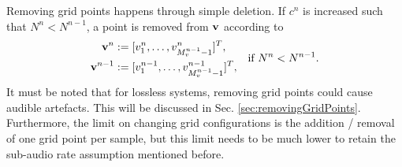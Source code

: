 \documentclass[fleqn]{jaes}
\begin{document}
Removing grid points happens through simple deletion. If $c^n$ is increased such that $N^n < N^{n-1}$, a point is removed from $\mathbf{v}$ according to
\begin{equation}\label{eq:removePoint}
\begin{aligned}
    \v^n &:= [v_1^n, \hdots, v_{M_v^{n-1}-1}^n]^T,\\
    \v^{n-1} &:= [v_1^{n-1}, \hdots, v_{M_v^{n-1}-1}^{n-1}]^T,
    \end{aligned} \quad \text{if } N^n < N^{n-1}.
\end{equation}
It must be noted that for lossless systems, removing grid points could cause audible artefacts. This will be discussed in Sec. \ref{sec:removingGridPoints}. Furthermore, the limit on changing grid configurations is the addition / removal of one grid point per sample, but this limit needs to be much lower to retain the sub-audio rate assumption mentioned before. %
\end{document}
